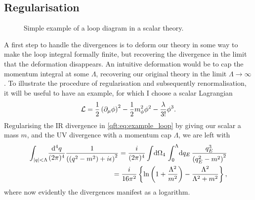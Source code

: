 \documentclass[../main.tex]{subfiles}
\begin{document}
\subsection{Regularisation}

\begin{figure}[!ht]
  \centering
  \caption{Simple example of a loop diagram in a scalar theory.}
  \label{qft:fig:example_loop}
\end{figure}

A first step to handle the divergences is to deform our theory in some way to
make the loop integral formally finite, but recovering the divergence in the
limit that the deformation disappears. An intuitive deformation would be to cap
the momentum integral at some \(\Lambda\), recovering our original theory in
the limit \(\Lambda \to \infty\). To illustrate the procedure of regularisation
and subsequently renormalisation, it will be useful to have an example, for
which I choose a scalar Lagrangian
\begin{equation}
  \label{qft:eq:example_lagrangian}
  \L = \frac{1}{2} \pclosed{\partial_\mu\phi}^2 - \frac{1}{2}m_\phi^2 \phi^2 - \frac{\lambda}{3!} \phi^3.
\end{equation}
 Regularising the IR divergence
in \cref{qft:eq:example_loop} by giving our scalar a mass \(m\), and the UV
divergence with a momentum cap \(\Lambda\), we are left with
\begin{align}
  \nonumber
  \int_{\abs{q} < \Lambda}\! \frac{\mathrm{d}^4q}{(2\pi)^4}
  \frac{1}{\pclosed{(q^2-m^2)+i\epsilon}^2} = \frac{i}{(2\pi)^4}
  \integral{\Omega_4} \integral[_0^\Lambda]{q_E} \frac{q_E^3}{\pclosed{q_E^2
      -
  m^2}^2} \\
  = \frac{i}{16\pi^2} \cclosed{\ln\pclosed{1 + \frac{\Lambda^2}{m^2}} -
    \frac{\Lambda^2}{\Lambda^2 + m^2}},
\end{align}
where now evidently the divergences manifest as a logarithm.
\medskip
\end{document}
